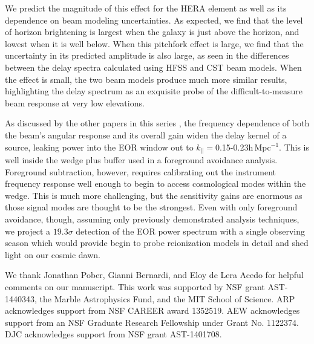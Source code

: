 \documentclass{emulateapj}
\begin{document}
We predict the magnitude of this effect for the HERA element as well as its dependence on beam modeling uncertainties. As expected, we find that the level of horizon brightening is largest when the galaxy is just above the horizon, and lowest when it is well below. When this pitchfork effect is large, we find that the uncertainty in its predicted amplitude is also large, as seen in the differences between the delay spectra calculated using HFSS and CST beam models. When the effect is small, the two beam models produce much more similar results, highlighting the delay spectrum as an exquisite probe of the difficult-to-measure beam response at very low elevations. 

As discussed by the other papers in this series \citep{ewallwice16,patra16,nithya16}, the frequency dependence of both the beam's angular response and its overall gain widen the delay kernel of a source, leaking power into the EOR window out to $k_\parallel=$0.15-0.23h\,Mpc$^{-1}$. This is well inside the wedge plus buffer used in a foreground avoidance analysis. Foreground subtraction, however, requires calibrating out the instrument frequency response well enough to begin to access cosmological modes within the wedge. This is much more challenging, but the sensitivity gains are enormous as those signal modes are thought to be the strongest. Even with only foreground avoidance, though, assuming only previously demonstrated analysis techniques, we project a $19.3\sigma$ detection of the EOR power spectrum with a single observing season which would provide begin to probe reionization models in detail and shed light on our cosmic dawn. 

\begin{acknowledgments}
We thank Jonathan Pober, Gianni Bernardi, and Eloy de Lera Acedo for helpful comments on our manuscript. This work was supported by NSF grant AST-1440343, the Marble Astrophysics Fund, and the MIT School of Science. ARP acknowledges support from NSF CAREER award 1352519. AEW acknowledges support from an NSF Graduate Research Fellowship under Grant No. 1122374. DJC acknowledges support from NSF grant AST-1401708.
\end{acknowledgments}


\end{document}

